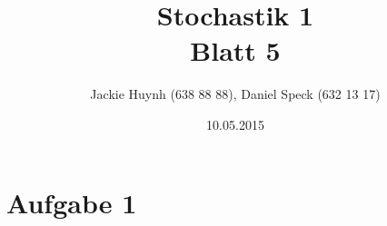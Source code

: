 \documentclass[10pt,a4paper]{article}
\title{\textbf{\huge Stochastik 1
\\\large Blatt 5}}
\author{Jackie Huynh (638 88 88), Daniel Speck (632 13 17)}
\date{10.05.2015}
\begin{document}
	\maketitle



	\section*{Aufgabe 1}



		\begin{flushright}
			\text{$\Box$}
		\end{flushright}
		
\end{document}
